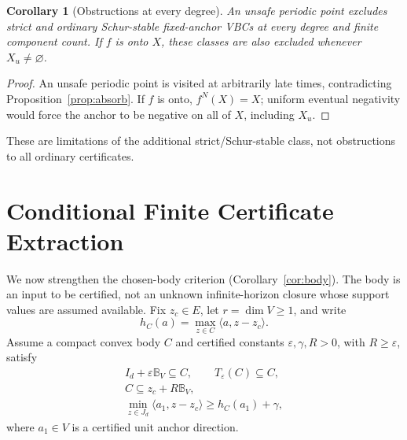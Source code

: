 \documentclass[journal,10pt]{IEEEtran}
\newtheorem{corollary}{Corollary}
\theoremstyle{definition}\newtheorem{definition}{Definition}
\theoremstyle{remark}
\newcommand{\ball}{\mathbb B_V}
\begin{document}
\begin{corollary}[Obstructions at every degree]\label{cor:onto}
An unsafe periodic point excludes strict and ordinary Schur-stable fixed-anchor VBCs at every degree and finite component count. If $f$ is onto $X$, these classes are also excluded whenever $X_u\neq\varnothing$.
\end{corollary}
\begin{proof}
An unsafe periodic point is visited at arbitrarily late times, contradicting Proposition~\ref{prop:absorb}. If $f$ is onto, $f^N(X)=X$; uniform eventual negativity would force the anchor to be negative on all of $X$, including $X_u$.
\end{proof}
These are limitations of the additional strict/Schur-stable class, not obstructions to all ordinary certificates.

\section{Conditional Finite Certificate Extraction}\label{sec:quant}
We now strengthen the chosen-body criterion (Corollary~\ref{cor:body}). The body is an input to be certified, not an unknown infinite-horizon closure whose support values are assumed available. Fix $z_c\in E$, let $r=\dim V\geq1$, and write
\[
 h_C(a)=\max_{z\in C}\langle a,z-z_c\rangle.
\]
Assume a compact convex body $C$ and certified constants $\varepsilon,\gamma,R>0$, with $R\geq\varepsilon$, satisfy
\begin{equation}\label{eq:bodydata}
\begin{gathered}
 I_d+\varepsilon\ball\subseteq C,\qquad T_\varepsilon(C)\subseteq C,\\
 C\subseteq z_c+R\ball,\\
 \min_{z\in J_d}\langle a_1,z-z_c\rangle\geq h_C(a_1)+\gamma,
\end{gathered}
\end{equation}
where $a_1\in V$ is a certified unit anchor direction.
\end{document}
